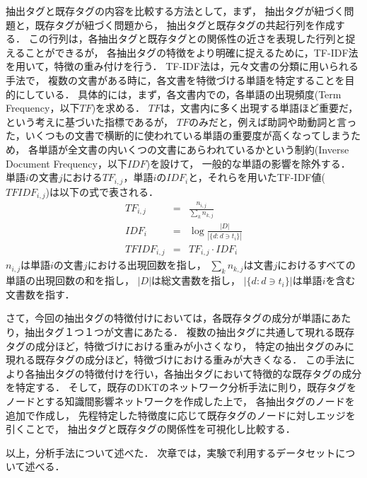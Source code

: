 抽出タグと既存タグの内容を比較する方法として，まず，
抽出タグが紐づく問題と，既存タグが紐づく問題から，
抽出タグと既存タグの共起行列を作成する．
この行列は，各抽出タグと既存タグとの関係性の近さを表現した行列と捉えることができるが，
各抽出タグの特徴をより明確に捉えるために，TF-IDF法を用いて，特徴の重み付けを行う．
TF-IDF法は，元々文書の分類に用いられる手法で，
複数の文書がある時に，各文書を特徴づける単語を特定することを目的にしている．
具体的には，まず，各文書内での，各単語の出現頻度(Term Frequency，以下$TF$)を求める．
$TF$は，文書内に多く出現する単語ほど重要だ，という考えに基づいた指標であるが，
$TF$のみだと，例えば助詞や助動詞と言った，いくつもの文書で横断的に使われている単語の重要度が高くなってしまうため，
各単語が全文書の内いくつの文書にあらわれているかという制約(Inverse Document Frequency，以下$IDF$)を設けて，
一般的な単語の影響を除外する．
単語$i$の文書$j$における$TF_{i,j}$，単語$i$の$IDF_i$と，それらを用いたTF-IDF値($TFIDF_{i,j}$)は以下の式で表される．
\begin{eqnarray}
TF_{i,j} &=& \frac {n_{i,j}}{\sum _{k}n_{k,j}}
\\
IDF_i &=& \log {\frac {|D|}{|\{d:d\ni t_{i}\}|}}
\\
TFIDF_{i,j} &=& TF_{i,j} \cdot IDF_i
\end{eqnarray}
$n_{i,j}$は単語$i$の文書$j$における出現回数を指し，
$\sum _{k}n_{k,j}$は文書$j$におけるすべての単語の出現回数の和を指し，
$|D|$は総文書数を指し，
$|\{d:d\ni t_{i}\}|$は単語$i$を含む文書数を指す．


さて，今回の抽出タグの特徴付けにおいては，各既存タグの成分が単語にあたり，抽出タグ１つ１つが文書にあたる．
複数の抽出タグに共通して現れる既存タグの成分ほど，特徴づけにおける重みが小さくなり，
特定の抽出タグのみに現れる既存タグの成分ほど，特徴づけにおける重みが大きくなる．
この手法により各抽出タグの特徴付けを行い，各抽出タグにおいて特徴的な既存タグの成分を特定する．
そして，既存のDKTのネットワーク分析手法に則り，既存タグをノードとする知識間影響ネットワークを作成した上で，
各抽出タグのノードを追加で作成し，
先程特定した特徴度に応じて既存タグのノードに対しエッジを引くことで，
抽出タグと既存タグの関係性を可視化し比較する．


\vvspace
以上，分析手法について述べた．
次章では，実験で利用するデータセットについて述べる．


